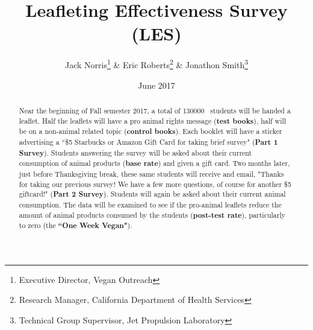 \documentclass{tufte-handout}
\title{Leafleting Effectiveness Survey (LES)}
\author[Jack Norris \& Eric Roberts \& Jonathon Smith]{Jack Norris\thanks{Executive Director, Vegan Outreach} \& Eric Roberts\thanks{Research Manager, California Department of Health Services} \& Jonathon Smith\thanks{Technical Group Supervisor, Jet Propulsion Laboratory}}
\date{June 2017} %
\newcommand{\totalbooklets}[0]{\textsc{130000}}%
\begin{document}
\maketitle%


\begin{abstract}
\noindent

Near the beginning of Fall semester 2017, a total of \totalbooklets~ 
students will be handed a leaflet. Half the leaflets will have a
pro animal rights message (\textbf{test books}), half will be on a
non-animal related topic (\textbf{control books}). Each booklet will have a
sticker advertising a ``\$5 Starbucks or Amazon Gift Card for taking
brief survey" (\textbf{Part 1 Survey}). Students answering the survey will be 
asked about their current consumption of animal products (\textbf{base rate}) 
and given a gift card. Two months later, just before Thanksgiving 
break, these same students will receive and email, "Thanks for taking 
our previous survey! We have a few more questions, of course for 
another \$5 giftcard!" (\textbf{Part 2 Survey}). Students will again
be asked about their current animal consumption. The data will
be examined to see if the pro-animal leaflets reduce the amount of
animal products consumed by the students (\textbf{post-test rate}), 
particularly to zero (the \textbf{``One Week Vegan"}). 

\end{abstract}

\end{document}

